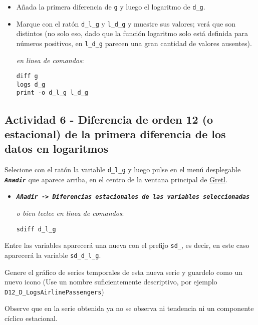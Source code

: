 \documentclass[11pt]{article}
\begin{document}
\begin{itemize}
\item Añada la primera diferencia de \texttt{g} y luego el logaritmo de \texttt{d\_g}.
\item Marque con el ratón \texttt{d\_l\_g} y \texttt{l\_d\_g} y muestre sus valores; verá
que son distintos (no solo eso, dado que la función logaritmo solo
está definida para números positivos, en \texttt{l\_d\_g} parecen una gran
cantidad de valores ausentes).

{\vspace{0pt} \footnotesize \color{gray!70!black}
\emph{en linea de comandos}: 
\begin{verbatim}
diff g
logs d_g
print -o d_l_g l_d_g
\end{verbatim}
}
\end{itemize}

\subsection{Actividad 6 - Diferencia de orden 12 (o estacional) de la primera diferencia de los datos en logaritmos}
\label{sec:org85bb633}
Selecione con el ratón la variable \texttt{d\_l\_g} y luego pulse en el menú desplegable \textbf{\emph{\texttt{Añadir}}} que aparece arriba, en el centro de la
ventana principal de \href{https://gretl.sourceforge.net/es.html}{Gretl}.
\begin{itemize}
\item \textbf{\emph{\texttt{Añadir -> Diferencias estacionales de las variables seleccionadas}}}

{\vspace{0pt} \footnotesize \color{gray!70!black}
\emph{o bien teclee en linea de comandos}: 
\begin{verbatim}
sdiff d_l_g
\end{verbatim}
}
\end{itemize}

Entre las variables aparecerá una nueva con el prefijo \texttt{sd\_}, es
decir, en este caso aparecerá la variable \texttt{sd\_d\_l\_g}.

Genere el gráfico de series temporales de esta nueva serie y guardelo
como un nuevo icono (Use un nombre suficientemente descriptivo, por
ejemplo \texttt{D12\_D\_LogsAirlinePassengers})

{\vspace{0pt} \footnotesize \color{gray!70!black}
}

Observe que en la serie obtenida ya no se observa ni tendencia ni un
componente cíclico estacional.
\end{document}
